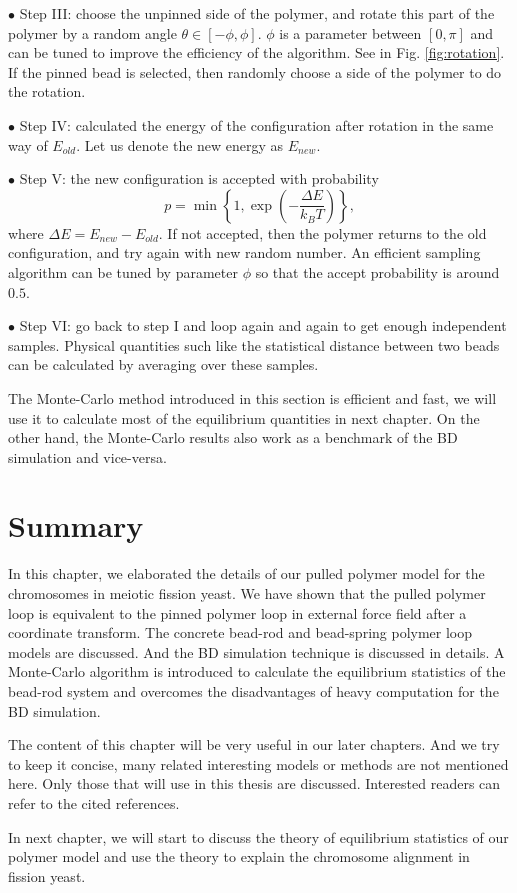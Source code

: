 $\bullet$ Step III: choose the unpinned side of the polymer, and rotate this part of the polymer by a random angle $\theta\in[-\phi, \phi]$. $\phi$ is a parameter between $[0,\pi]$ and can be tuned to improve the efficiency of the algorithm. See in Fig. \ref{fig:rotation}. If the pinned bead is selected, then randomly choose a side of the polymer to do the rotation. 

$\bullet$ Step IV: calculated the energy of the configuration after rotation in the same way of $E_{old}$. Let us denote the new energy as $E_{new}$.

$\bullet$ Step V: the new configuration is accepted with probability  
\begin{equation}
    \label{eq:mcProbability}
    p = \min\left\{1, \exp\left(-\frac{\Delta E}{k_BT}\right)\right\},
\end{equation}
where $\Delta E = E_{new} - E_{old}$. If not accepted, then the polymer returns to the old configuration, and try again with new random number. An efficient sampling algorithm can be tuned by parameter $\phi$ so that the accept probability is around $0.5$.

$\bullet$ Step VI: go back to step I and loop again and again to get enough independent samples. Physical quantities such like the statistical distance between two beads can be calculated by averaging over these samples.

The Monte-Carlo method introduced in this section is efficient and fast, we will use it to calculate most of the equilibrium quantities in next chapter. On the other hand, the Monte-Carlo results also work as a benchmark of the BD simulation and vice-versa. 



\section{Summary}
\label{sec:summary_chap2}

In this chapter, we elaborated the details of our pulled polymer model for the chromosomes in meiotic fission yeast. We have shown that the pulled polymer loop is equivalent to the pinned polymer loop in external force field after a coordinate transform. The concrete bead-rod and bead-spring polymer loop models are discussed. And the BD simulation technique is discussed in details. A Monte-Carlo algorithm is introduced to calculate the equilibrium statistics of the bead-rod system and overcomes the disadvantages of heavy computation for the BD simulation.

The content of this chapter will be very useful in our later chapters. And we try to keep it concise, many related interesting models or methods are not mentioned here. Only those that will use in this thesis are discussed. Interested readers can refer to the cited references.

In next chapter, we will start to discuss the theory of equilibrium statistics of our polymer model and use the theory to explain the chromosome alignment in fission yeast. 
